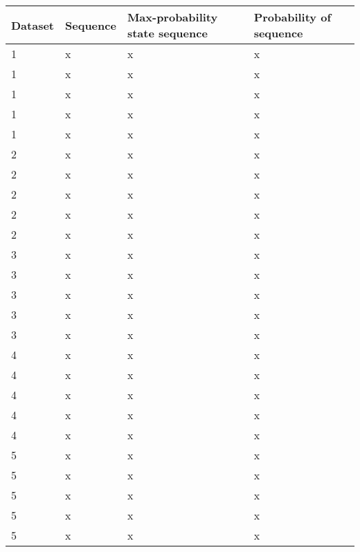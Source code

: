 \begin{solution}
	
\begin{center}
  \begin{tabular}{ l | l |l | l }
Dataset & Sequence & Max-probability state sequence & Probability of sequence  \\ \hline
1 & x                       & x                     & x\\
1 & x                  & x                & x\\
1 & x             & x           & x\\
1 & x        & x      & x\\
1 & x   & x & x
 \\ \hline
2 & x                       & x                     & x\\
2 & x                  & x                & x\\
2 & x             & x           & x\\
2 & x        & x      & x\\
2 & x   & x & x
 \\ \hline
3 & x                       & x                     & x\\
3 & x                  & x                & x\\
3 & x             & x           & x\\
3 & x        & x      & x\\
3 & x   & x & x
 \\ \hline
4 & x                       & x                     & x\\
4 & x                  & x                & x\\
4 & x             & x           & x\\
4 & x        & x      & x\\
4 & x   & x & x
 \\ \hline
5 & x                       & x                     & x\\
5 & x                  & x                & x\\
5 & x             & x           & x\\
5 & x        & x      & x\\
5 & x   & x & x
 \\ \hline

  \end{tabular}
\end{center}
\end{solution}
\newpage

